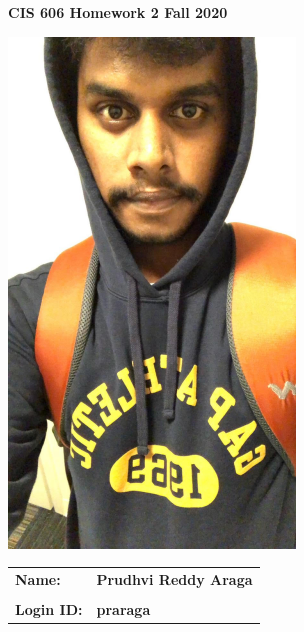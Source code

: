 \documentclass[11pt]{article}
\begin{document}
\thispagestyle{plain}

\begin{center}
{\Large \bf CIS 606 \hfil Homework 2 \hfil Fall 2020} \\
\end{center}

\vskip 1in 

\centerline{\includegraphics[width=3in]{Photo.jpg}}

\vskip 0.5in 

\begin{center}
\begin{tabular}{ll}
{\bf Name:}     & {\bf Prudhvi Reddy Araga } \\ \\
{\bf Login ID:} & {\bf praraga }   
\end{tabular}
\end{center}

\newpage
\end{document}
